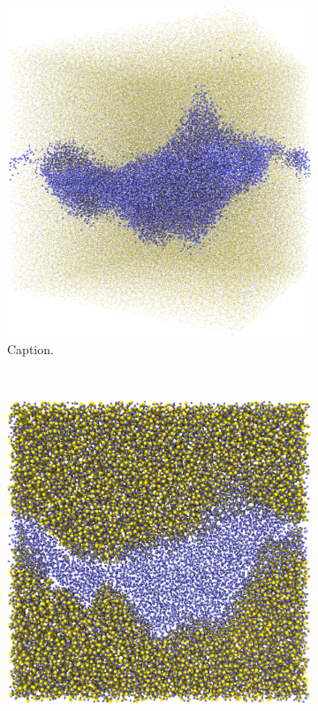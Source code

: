 \begin{figure}[htpb]
\begin{subfigure}[b]{\myfigwidth}
    \end{subfigure}%
    \hfill%
        \begin{subfigure}[b]{\myfigwidth}%
        \centering%
        \includegraphics[width=\textwidth]{images/systems/trimmed-rough_fracture01_abel_15}%
        \caption{Caption.}%
    \end{subfigure}%
    \\%
    \begin{subfigure}[b]{\myfigwidth}%
        \centering%
        \includegraphics[width=\textwidth]{images/systems/trimmed-rough_fracture01_abel_16}%

\end{subfigure}
\end{figure}
